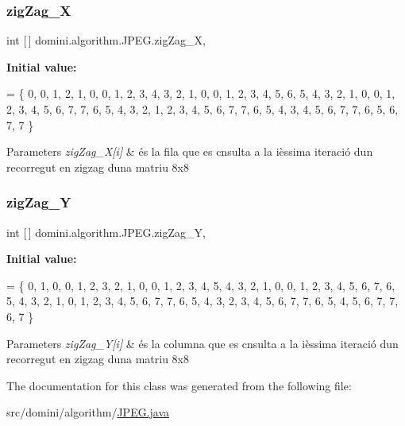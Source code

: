 \subsubsection{\texorpdfstring{zig\+Zag\+\_\+X}{zigZag\_X}}
{\footnotesize\ttfamily int \mbox{[}$\,$\mbox{]} domini.\+algorithm.\+J\+P\+E\+G.\+zig\+Zag\+\_\+X\hspace{0.3cm}{\ttfamily [static]}, {\ttfamily [private]}}

{\bfseries Initial value\+:}
\begin{DoxyCode}
= \{
        0,
        0, 1,
        2, 1, 0,
        0, 1, 2, 3, 
        4, 3, 2, 1, 0,
        0, 1, 2, 3, 4, 5,
        6, 5, 4, 3, 2, 1, 0,
        0, 1, 2, 3, 4, 5, 6, 7,
        7, 6, 5, 4, 3, 2, 1,
        2, 3, 4, 5, 6, 7,
        7, 6, 5, 4, 3,
        4, 5, 6, 7, 
        7, 6, 5,
        6, 7,
        7
    \}
\end{DoxyCode}

\begin{DoxyParams}{Parameters}
{\em zig\+Zag\+\_\+\+X\mbox{[}i\mbox{]}} & és la fila que es cnsulta a la ièssima iteració d\textquotesingle{}un recorregut en zigzag d\textquotesingle{}una matriu 8x8 \\
\hline
\end{DoxyParams}
\mbox{\label{classdomini_1_1algorithm_1_1JPEG_ad886d8aa00a40cb151b446534f0d1bcc}} 
\subsubsection{\texorpdfstring{zig\+Zag\+\_\+Y}{zigZag\_Y}}
{\footnotesize\ttfamily int \mbox{[}$\,$\mbox{]} domini.\+algorithm.\+J\+P\+E\+G.\+zig\+Zag\+\_\+Y\hspace{0.3cm}{\ttfamily [static]}, {\ttfamily [private]}}

{\bfseries Initial value\+:}
\begin{DoxyCode}
= \{
        0,
        1, 0,
        0, 1, 2,
        3, 2, 1, 0,
        0, 1, 2, 3, 4,
        5, 4, 3, 2, 1, 0,
        0, 1, 2, 3, 4, 5, 6,
        7, 6, 5, 4, 3, 2, 1, 0,
        1, 2, 3, 4, 5, 6, 7,
        7, 6, 5, 4, 3, 2,
        3, 4, 5, 6, 7,
        7, 6, 5, 4,
        5, 6, 7,
        7, 6,
        7
    \}
\end{DoxyCode}

\begin{DoxyParams}{Parameters}
{\em zig\+Zag\+\_\+\+Y\mbox{[}i\mbox{]}} & és la columna que es cnsulta a la ièssima iteració d\textquotesingle{}un recorregut en zigzag d\textquotesingle{}una matriu 8x8 \\
\hline
\end{DoxyParams}


The documentation for this class was generated from the following file\+:\begin{DoxyCompactItemize}
\item 
src/domini/algorithm/\hyperlink{JPEG_8java}{J\+P\+E\+G.\+java}\end{DoxyCompactItemize}
